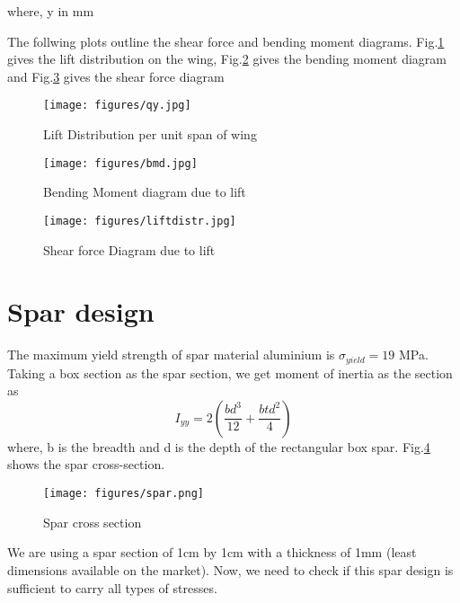 \documentclass[a4paper,10pt]{report}
\begin{document}
where, y in mm

The follwing plots outline the shear force and bending moment diagrams. Fig.\ref{fig:liftdist} gives the lift distribution on the wing, Fig.\ref{fig:BMD} gives the bending moment diagram and Fig.\ref{fig:SFD} gives the shear force diagram
\begin{figure}[H]
    \begin{center}
      \texttt{[image: figures/qy.jpg]}
\caption{Lift Distribution per unit span of wing}
       \label{fig:liftdist}
    \end{center}
\end{figure}

\begin{figure}[H]
    \begin{center}
      \texttt{[image: figures/bmd.jpg]}
\caption{Bending Moment diagram due to lift}
       \label{fig:BMD}
    \end{center}
\end{figure}
\begin{figure}[H]
    \begin{center}
      \texttt{[image: figures/liftdistr.jpg]}
\caption{Shear force Diagram due to lift}
       \label{fig:SFD}
    \end{center}
\end{figure}


\section{Spar design}
The maximum yield strength of spar material aluminium is $\sigma_{yield} = 19$ MPa. Taking a box section as the spar section, we get moment of inertia as the section as 
\begin{equation} I_{yy} = 2\left(\frac{bd^3}{12} + \frac{btd^2}{4}\right) \end{equation}
where, b is the breadth and d is the depth of the rectangular box spar. Fig.\ref{fig:spar} shows the spar cross-section.
\begin{figure}[H]
    \begin{center}
      \texttt{[image: figures/spar.png]}
\caption{Spar cross section}
       \label{fig:spar}
    \end{center}
\end{figure}
We are using a spar section of 1cm by 1cm with a thickness of 1mm (least dimensions available on the market). Now, we need to check if this spar design is sufficient to carry all types of stresses.
\end{document}
